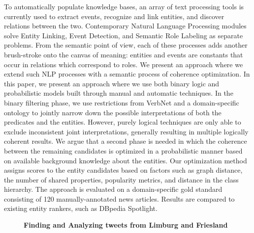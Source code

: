 \documentclass[10pt, a4paper, twopage, headinclude, footinclude, BCOR5mm]{scrartcl}
\begin{document}
\noindent
To automatically populate knowledge bases, an array of text processing tools is currently used to extract events, recognize and link entities, and discover relations between the two. Contemporary Natural Language Processing modules solve Entity Linking, Event Detection, and Semantic Role Labeling as separate problems. From the semantic point of view, each of these processes adds another brush-stroke onto the canvas of meaning: entities and events are constants that occur in relations which correspond to roles. We present an approach where we extend such NLP processes with a semantic process of coherence optimization.  In this paper, we present an approach where we use both binary logic and probabilistic models built through manual and automatic techniques. In the binary filtering phase, we use restrictions from VerbNet and a domain-specific ontology to jointly narrow down the possible interpretations of both the predicates and the entities. However, purely logical techniques are only able to exclude inconsistent joint interpretations, generally resulting in multiple logically coherent results. We argue that a second phase is needed in which the coherence between the remaining candidates is optimized in a probabilistic manner based on available background knowledge about the entities. Our optimization method assigns scores to the entity candidates based on factors such as graph distance, the number of shared properties, popularity metrics, and distance in the class hierarchy.  The approach is evaluated on a domain-specific gold standard consisting of 120 manually-annotated news articles. Results are compared to existing entity rankers, such as DBpedia Spotlight.


\newpage

\begin{figure}[t!]
\centering
\large\textbf{Finding and Analyzing tweets from Limburg and Friesland}
\vspace*{0.5cm}
\end{figure}
\end{document}

